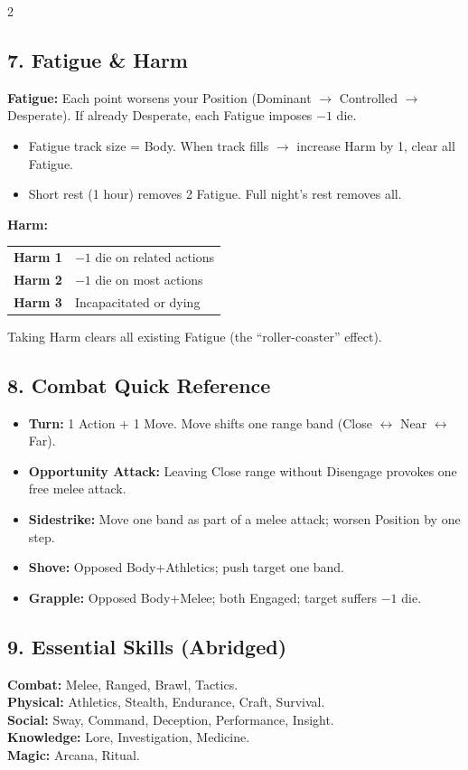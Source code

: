 \documentclass[10pt,landscape]{article}
\begin{document}
\begin{multicols}{2}
\subsection*{7. Fatigue \& Harm}
\textbf{Fatigue:} Each point worsens your Position (Dominant $\rightarrow$ Controlled $\rightarrow$ Desperate). If already Desperate, each Fatigue imposes $-1$ die.
\begin{itemize}
    \item Fatigue track size = Body. When track fills $\rightarrow$ increase Harm by 1, clear all Fatigue.
    \item Short rest (1 hour) removes 2 Fatigue. Full night's rest removes all.
\end{itemize}
\textbf{Harm:}
\begin{tabularx}{\linewidth}{@{} l X @{}}
\textbf{Harm 1} & $-1$ die on related actions \\
\textbf{Harm 2} & $-1$ die on most actions \\
\textbf{Harm 3} & Incapacitated or dying \\
\end{tabularx}
\vspace{0.5ex}
Taking Harm clears all existing Fatigue (the ``roller-coaster'' effect).

\subsection*{8. Combat Quick Reference}
\begin{itemize}
    \item \textbf{Turn:} 1 Action + 1 Move. Move shifts one range band (Close $\leftrightarrow$ Near $\leftrightarrow$ Far).
    \item \textbf{Opportunity Attack:} Leaving Close range without Disengage provokes one free melee attack.
    \item \textbf{Sidestrike:} Move one band as part of a melee attack; worsen Position by one step.
    \item \textbf{Shove:} Opposed Body+Athletics; push target one band.
    \item \textbf{Grapple:} Opposed Body+Melee; both Engaged; target suffers $-1$ die.
\end{itemize}
\vfill\null
\columnbreak

\subsection*{9. Essential Skills (Abridged)}
\textbf{Combat:} Melee, Ranged, Brawl, Tactics. \\
\textbf{Physical:} Athletics, Stealth, Endurance, Craft, Survival. \\
\textbf{Social:} Sway, Command, Deception, Performance, Insight. \\
\textbf{Knowledge:} Lore, Investigation, Medicine. \\
\textbf{Magic:} Arcana, Ritual.


\end{multicols}
\end{document}
